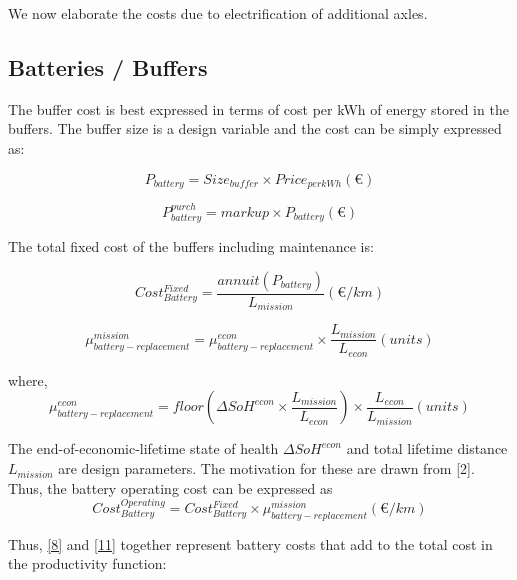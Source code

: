 \documentclass[ExampleMasters.tex]{subfiles}
\begin{document}
			\par
			We now elaborate the costs due to electrification of additional axles.

		\subsection{Batteries / Buffers}

			The buffer cost is best expressed in terms of cost per kWh of energy stored in the buffers. The buffer size is a design variable and the cost can be simply expressed as:

			\begin{equation}
				P_{battery}= Size_{buffer} \times Price_{perkWh} (\euro{})
			\end{equation}

			\begin{equation} 
				P^{purch}_{battery} = markup \times P_{battery} (\euro{})
			\end{equation}

			The total fixed cost of the buffers including maintenance is:

			\begin{equation} \label{8}
				Cost_{Battery}^{Fixed} = \frac{annuit(P_{battery})}{L_{mission}} (\euro{}/km)
			\end{equation}

			\begin{equation}
				\mu_{battery-replacement}^{mission} = \mu_{battery-replacement}^{econ} \times \frac{L_ {mission}}{L_{econ}} (units)
			\end{equation}

			where,
			\begin{equation}
				\mu_{battery-replacement}^{econ} = floor(\Delta SoH^{econ}\times \frac{L_ {mission}}{L_{econ}}) \times \frac{L_ {econ}}{L_{mission}} (units)
			\end{equation}

			The end-of-economic-lifetime state of health $\Delta SoH^{econ}$ and total lifetime distance $L_{mission}$ are design parameters. The motivation for these are drawn from [2]. Thus, the battery operating cost can be expressed as
			\begin{equation} \label{11}
				Cost_{Battery}^{Operating} = Cost_{Battery}^{Fixed} \times \mu_{battery-replacement}^{mission} (\euro{}/km)
			\end{equation}

			Thus, \eqref{8} and \eqref{11} together represent battery costs that add to the total cost in the productivity function:
\end{document}
